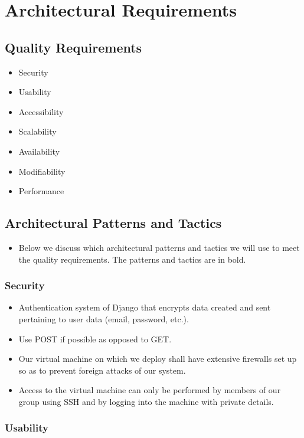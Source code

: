 \documentclass[12pt]{article}
\begin{document}
\newpage

\section{Architectural Requirements}

\subsection{Quality Requirements}
\begin{itemize}
\item Security
\item Usability
\item Accessibility
\item Scalability
\item Availability
\item Modifiability
\item Performance
\end{itemize}

\subsection{Architectural Patterns and Tactics}
\begin{itemize}
  \item Below we discuss which architectural patterns and tactics we will use to meet the quality requirements. The patterns and tactics are in bold.
\end{itemize}

\subsubsection*{Security}
\begin{itemize}
\item Authentication system of Django that encrypts data created and sent pertaining to user data (email, password, etc.).
\item Use POST if possible as opposed to GET.
\item Our virtual machine on which we deploy shall have extensive firewalls set up so as to prevent foreign attacks of our system.
\item Access to the virtual machine can only be performed by members of our group using SSH and by logging into the machine with private details.
\end{itemize}

\subsubsection*{Usability}
\end{document}
